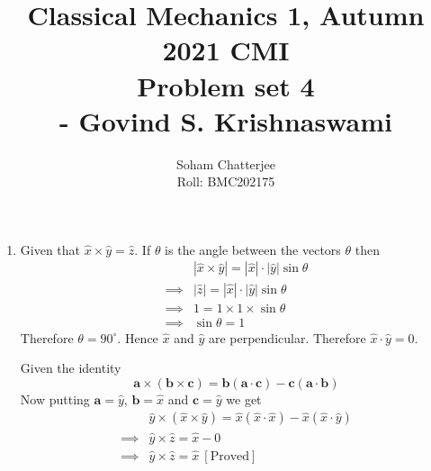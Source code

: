 \documentclass{article}
\title{\huge{Classical Mechanics 1, Autumn 2021 CMI \\ Problem set 4\\\hspace{7cm}- Govind S. Krishnaswami}
}
\author{Soham Chatterjee\\Roll: BMC202175}
\date{}
\newcommand{\bma}{\boldsymbol{a}}
\newcommand{\bmb}{\boldsymbol{b}}
\newcommand{\bmc}{\boldsymbol{c}}
\begin{document}
	\maketitle\pagebreak
	\begin{enumerate}
		\item Given that $\hat{x}\times\hat{y}=\hat{z}$. If $\theta$ is the angle between the vectors $\theta$ then\begin{align*}
		& |\hat{x}\times\hat{y}|=|\hat{x}|\cdot|\hat{y}|\sin\theta\\
		\implies & |\hat{z}|=|\hat{x}|\cdot|\hat{y}|\sin\theta\\
		\implies & 1=1\times 1\times \sin\theta\\
		\implies & \sin\theta=1
	\end{align*}
Therefore $\theta=90^{\circ}$. Hence $\hat{x}$ and $\hat{y}$ are perpendicular. Therefore $\hat{x}\cdot\hat{y}=0$.

\hspace{1cm}Given the identity$$\bma \times (\bmb\times\bmc)=\bmb(\bma\cdot\bmc)-\bmc(\bma\cdot\bmb)$$
Now putting $\bma=\hat{y}$, $\bmb=\hat{x}$ and $\bmc=\hat{y}$ we get\begin{align*}
	& \hat{y}\times(\hat{x}\times\hat{y})=\hat{x}(\hat{x}\cdot\hat{x})-\hat{x}(\hat{x}\cdot\hat{y})\\
	\implies & \hat{y}\times \hat{z}=\hat{x}-0\\
	\implies & \hat{y}\times \hat{z}=\hat{x}\ [\text{Proved}]
\end{align*}


\end{enumerate}
\end{document}
